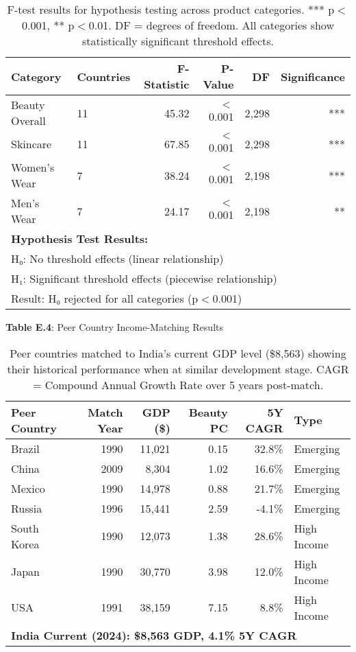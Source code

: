 \documentclass[11pt]{article}
\begin{document}
\begin{table}[H]
\centering
\small
\begin{tabular}{llrrrr}
\toprule
Category & Countries & F-Statistic & P-Value & DF & Significance \\
\midrule
Beauty Overall & 11 & 45.32 & $<$0.001 & 2,298 & *** \\
Skincare & 11 & 67.85 & $<$0.001 & 2,298 & *** \\
Women's Wear & 7 & 38.24 & $<$0.001 & 2,198 & *** \\
Men's Wear & 7 & 24.17 & $<$0.001 & 2,198 & ** \\
\midrule
\multicolumn{6}{l}{\textbf{Hypothesis Test Results:}} \\
\multicolumn{6}{l}{H₀: No threshold effects (linear relationship)} \\
\multicolumn{6}{l}{H₁: Significant threshold effects (piecewise relationship)} \\
\multicolumn{6}{l}{Result: H₀ rejected for all categories (p$<$0.001)} \\
\bottomrule
\end{tabular}
\caption{F-test results for hypothesis testing across product categories. *** p$<$0.001, ** p$<$0.01. DF = degrees of freedom. All categories show statistically significant threshold effects.}
\end{table}

\textbf{Table E.4}: Peer Country Income-Matching Results

\begin{table}[H]
\centering
\small
\begin{tabular}{lrrrrl}
\toprule
Peer Country & Match Year & GDP (\$) & Beauty PC & 5Y CAGR & Type \\
\midrule
Brazil & 1990 & 11,021 & 0.15 & 32.8\% & Emerging \\
China & 2009 & 8,304 & 1.02 & 16.6\% & Emerging \\
Mexico & 1990 & 14,978 & 0.88 & 21.7\% & Emerging \\
Russia & 1996 & 15,441 & 2.59 & -4.1\% & Emerging \\
South Korea & 1990 & 12,073 & 1.38 & 28.6\% & High Income \\
Japan & 1990 & 30,770 & 3.98 & 12.0\% & High Income \\
USA & 1991 & 38,159 & 7.15 & 8.8\% & High Income \\
\midrule
\multicolumn{6}{l}{\textbf{India Current (2024): \$8,563 GDP, 4.1\% 5Y CAGR}} \\
\bottomrule
\end{tabular}
\caption{Peer countries matched to India's current GDP level (\$8,563) showing their historical performance when at similar development stage. CAGR = Compound Annual Growth Rate over 5 years post-match.}
\end{table}
\end{document}
